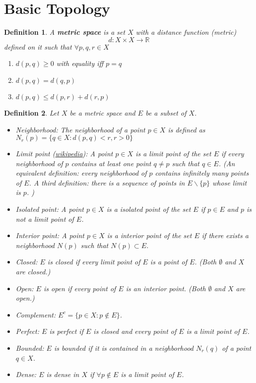 \documentclass[aps,pra,onecolumn,notitlepage,superscriptaddress]{revtex4-1}
\newcommand{\R}{\mathbb{R}}
\newtheorem{defi}{Definition}
\begin{document}
    \section{Basic Topology}
    \begin{defi}
        A \textbf{metric space} is a set $X$ with a distance function (metric) 
        \begin{equation}
            d : X \times X \to \R
        \end{equation} 
        defined on it such that $\forall p,q,r \in X$
        \begin{enumerate}
            \item $d(p, q) \geq 0$ with equality iff $p=q$
            \item $d(p,q) = d(q,p)$
            \item $d(p,q) \leq d(p,r) + d(r,p)$
        \end{enumerate}
    \end{defi}

    \begin{defi} Let $X$ be a metric space and $E$ be a subset of $X$.
        \begin{itemize}
            \item Neighborhood: The neighborhood of a point $p \in X$ is defined as $N_r(p) = \{ q \in X: d(p,q) < r, r > 0 \}$
            \item Limit point (\href{https://en.wikipedia.org/wiki/Limit_point}{wikipedia}): A point $p \in X$ is a limit point of the set $E$ if every neighborhood of $p$ contains at least one point $q \neq p$ such that $q \in E$. (An equivalent definition: every neighborhood of $p$ contains infinitely many points of $E$. A third definition: there is a sequence of points in $E \backslash \{p\}$ whose limit is $p$. )
            \item Isolated point: A point $p \in X$ is a isolated point of the set $E$ if $p \in E$ and $p$ is not a limit point of $E$.
            \item Interior point: A point $p \in X$ is a interior point of the set $E$ if there exists a neighborhood $N(p)$ such that $N(p) \subset E$.
            \item Closed: $E$ is closed if every limit point of $E$ is a point of $E$. (Both $\emptyset$ and $X$ are closed.)
            \item Open: $E$ is open if every point of $E$ is an interior point. (Both $\emptyset$ and $X$ are open.)
            \item Complement: $E^c = \{ p \in X : p \notin E \}$.
            \item Perfect: $E$ is perfect if $E$ is closed and every point of $E$ is a limit point of $E$.
            \item Bounded: $E$ is bounded if it is contained in a neighborhood $N_r(q)$ of a point $q \in X$.
            \item Dense: $E$ is dense in $X$ if $\forall p \notin E$ is a limit point of $E$.
        \end{itemize}
    \end{defi}
\end{document}
